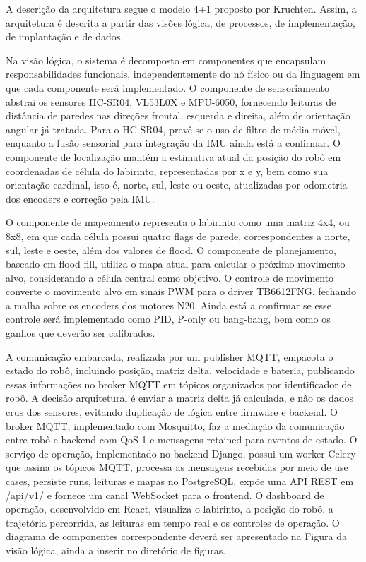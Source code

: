     A descrição da arquitetura segue o modelo 4+1 proposto por Kruchten. Assim, a arquitetura é descrita a partir das visões lógica, de processos, de implementação, de implantação e de dados.

    Na visão lógica, o sistema é decomposto em componentes que encapsulam responsabilidades funcionais, independentemente do nó físico ou da linguagem em que cada componente será implementado. O componente de sensoriamento abstrai os sensores HC-SR04, VL53L0X e MPU-6050, fornecendo leituras de distância de paredes nas direções frontal, esquerda e direita, além de orientação angular já tratada. Para o HC-SR04, prevê-se o uso de filtro de média móvel, enquanto a fusão sensorial para integração da IMU ainda está a confirmar. O componente de localização mantém a estimativa atual da posição do robô em coordenadas de célula do labirinto, representadas por x e y, bem como sua orientação cardinal, isto é, norte, sul, leste ou oeste, atualizadas por odometria dos encoders e correção pela IMU.

    O componente de mapeamento representa o labirinto como uma matriz 4x4, ou 8x8, em que cada célula possui quatro flags de parede, correspondentes a norte, sul, leste e oeste, além dos valores de flood. O componente de planejamento, baseado em flood-fill, utiliza o mapa atual para calcular o próximo movimento alvo, considerando a célula central como objetivo. O controle de movimento converte o movimento alvo em sinais PWM para o driver TB6612FNG, fechando a malha sobre os encoders dos motores N20. Ainda está a confirmar se esse controle será implementado como PID, P-only ou bang-bang, bem como os ganhos que deverão ser calibrados.

    A comunicação embarcada, realizada por um publisher MQTT, empacota o estado do robô, incluindo posição, matriz delta, velocidade e bateria, publicando essas informações no broker MQTT em tópicos organizados por identificador de robô. A decisão arquitetural é enviar a matriz delta já calculada, e não os dados crus dos sensores, evitando duplicação de lógica entre firmware e backend. O broker MQTT, implementado com Mosquitto, faz a mediação da comunicação entre robô e backend com QoS 1 e mensagens retained para eventos de estado. O serviço de operação, implementado no backend Django, possui um worker Celery que assina os tópicos MQTT, processa as mensagens recebidas por meio de use cases, persiste runs, leituras e mapas no PostgreSQL, expõe uma API REST em /api/v1/ e fornece um canal WebSocket para o frontend. O dashboard de operação, desenvolvido em React, visualiza o labirinto, a posição do robô, a trajetória percorrida, as leituras em tempo real e os controles de operação. O diagrama de componentes correspondente deverá ser apresentado na Figura da visão lógica, ainda a inserir no diretório de figuras.

